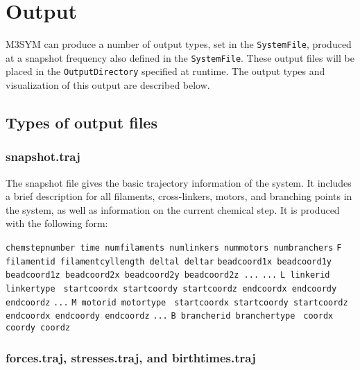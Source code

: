 \documentclass[11pt, oneside]{article}   	%
\begin{document}
\section {Output}

M3SYM can produce a number of output types, set in the \texttt{SystemFile}, produced at a snapshot frequency also defined in the \texttt{SystemFile}. These output files will be placed in the \texttt{OutputDirectory} specified at runtime. The output types and visualization of this output are described below.

\subsection{Types of output files}
\subsubsection{snapshot.traj}
The snapshot file gives the basic trajectory information of the system. It includes a brief description for all filaments, cross-linkers, motors, and branching points in the system, as well as information on the current chemical step. It is produced with the following form:\newline

\noindent\texttt{chemstepnumber time numfilaments numlinkers nummotors numbranchers}\newline
\texttt{F filamentid filamentcyllength deltal deltar}\newline
\texttt{beadcoord1x beadcoord1y beadcoord1z beadcoord2x beadcoord2y beadcoord2z ...}\newline
\texttt{...}\newline
\texttt{L linkerid linkertype }\newline
\texttt{startcoordx startcoordy startcoordz endcoordx endcoordy endcoordz}\newline
\texttt{...}\newline
\texttt{M motorid motortype }\newline
\texttt{startcoordx startcoordy startcoordz endcoordx endcoordy endcoordz}\newline
\texttt{...}\newline
\texttt{B brancherid branchertype }\newline
\texttt{coordx coordy coordz}\newline

\subsubsection{forces.traj, stresses.traj, and birthtimes.traj}
\end{document}
